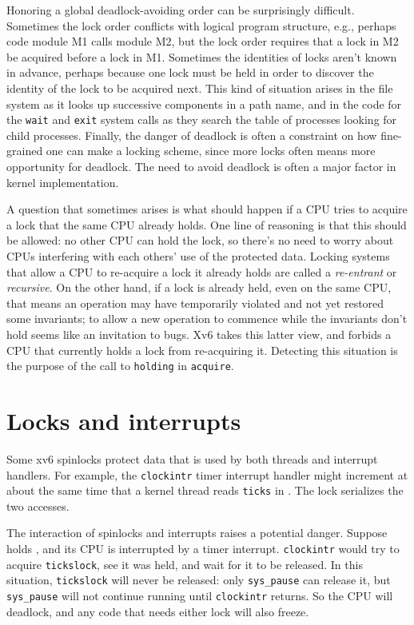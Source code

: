 Honoring a global deadlock-avoiding order can be surprisingly
difficult. Sometimes the lock order conflicts with logical program
structure, e.g., perhaps code module M1 calls module M2, but the lock
order requires that a lock in M2 be acquired before a lock in M1.
Sometimes the identities of locks aren't known in advance, perhaps
because one lock must be held in order to discover the identity
of the lock to be acquired next. This kind of situation arises in the
file system as it looks up successive components in a path name, and
in the code for the {\tt wait} and {\tt exit} system calls
as they search the table of
processes looking for child processes. Finally, the danger of deadlock
is often a constraint on how fine-grained one can make a locking
scheme, since more locks often means more opportunity for deadlock.
The need to avoid deadlock is often a major factor in kernel
implementation.

A question that sometimes arises is what should happen if a CPU tries
to acquire a lock that the same CPU already holds. One line of
reasoning is that this should be allowed: no other CPU can hold the
lock, so there's no need to worry about CPUs interfering with each
others' use of the protected data. Locking systems that allow a CPU to
re-acquire a lock it already holds are called a {\it re-entrant} or {\it
  recursive}. On the other hand, if a lock is already held, even on
the same CPU, that means an operation may have temporarily violated
and not yet restored some invariants; to allow a new operation to
commence while the invariants don't hold seems like an invitation to
bugs. Xv6 takes this latter view, and forbids a CPU that currently
holds a lock from re-acquiring it. Detecting this situation is the
purpose of the call to {\tt holding} in {\tt acquire}.

\section{Locks and interrupts}
\label{s:lockinter}

Some xv6 spinlocks protect data that is used by
both threads and interrupt handlers.
For example, the
\lstinline{clockintr}
timer interrupt handler might increment
at about the same time that a kernel
thread reads
\lstinline{ticks} 
in
.
The lock
serializes the two accesses.

The interaction of spinlocks and interrupts raises a potential danger.
Suppose
holds
,
and its CPU is interrupted by a timer interrupt.
\lstinline{clockintr}
would try to acquire
\lstinline{tickslock},
see it was held, and wait for it to be released.
In this situation,
\lstinline{tickslock}
will never be released: only
\lstinline{sys_pause}
can release it, but
\lstinline{sys_pause}
will not continue running until
\lstinline{clockintr}
returns.
So the CPU will deadlock, and any code
that needs either lock will also freeze.

